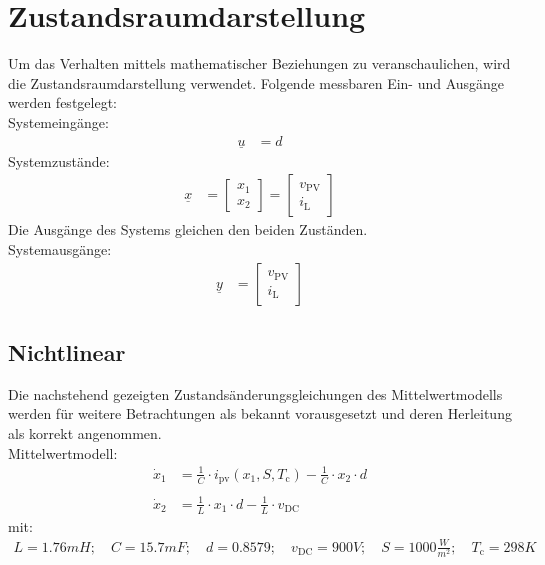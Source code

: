 \section{Zustandsraumdarstellung} \label{sec:Zustandsraumdarstellung}
Um das Verhalten mittels mathematischer Beziehungen zu veranschaulichen, wird die Zustandsraumdarstellung verwendet. Folgende messbaren Ein- und Ausgänge werden festgelegt:\\
\newline
Systemeingänge:
\begin{align*}
    \underline{u} &= d
\end{align*}
\newline
Systemzustände:
\begin{align}
    \underline{x} &=
    \begin{bmatrix}
        x_{\mathrm{1}} \\
        x_{\mathrm{2}}
    \end{bmatrix} = 
    \begin{bmatrix}
        v_{\mathrm{PV}} \\
        i_{\mathrm{L}}
    \end{bmatrix}
    \label{eq:Gleichung9}
\end{align}
\newline
Die Ausgänge des Systems gleichen den beiden Zuständen.\\
\newline
Systemausgänge:
\begin{align*}
    \underline{y} &= 
    \begin{bmatrix}
        v_{\mathrm{PV}} \\
        i_{\mathrm{L}}
    \end{bmatrix}
\end{align*}

\subsection{Nichtlinear}
\label{sec:Nichtlinear}
Die nachstehend gezeigten Zustandsänderungsgleichungen des Mittelwertmodells werden für weitere Betrachtungen als bekannt vorausgesetzt und deren Herleitung als korrekt angenommen.\\
\newline
Mittelwertmodell:
\begin{align*}
    \dot{x}_{\mathrm{1}} &= \frac{1}{C}\cdot i_{\mathrm{pv}}(x_{\mathrm{1}}, S, T_{\mathrm{c}})-\frac{1}{C}\cdot x_{\mathrm{2}}\cdot d \\\\
    \dot{x}_{\mathrm{2}} &= \frac{1}{L}\cdot x_{\mathrm{1}}\cdot d-\frac{1}{L}\cdot v_{\mathrm{DC}}
\end{align*}
\newline
mit:
\begin{align*}
    L = 1.76mH;\quad C = 15.7mF;\quad d = 0.8579;\quad v_{\mathrm{DC}} = 900V;\quad S = 1000\frac{W}{m^2};\quad T_{\mathrm{c}} = 298K
\end{align*}

